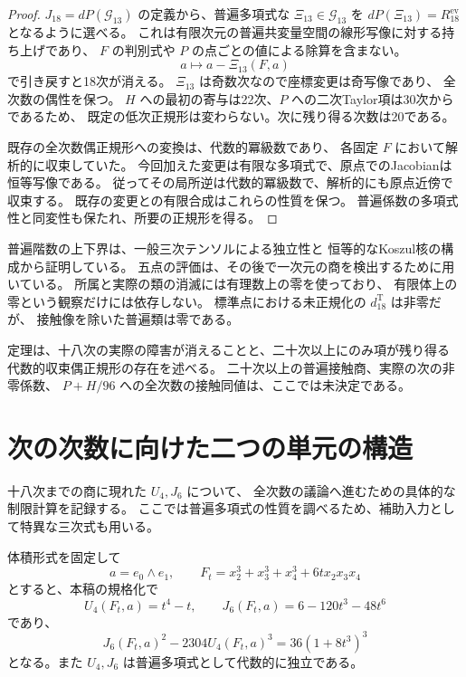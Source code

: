 \begin{proof}
$J_{18}=dP(\mathcal G_{13})$ の定義から、普遍多項式な
$\Xi_{13}\in\mathcal G_{13}$ を
$dP(\Xi_{13})=R_{18}^{\mathrm{ev}}$ となるように選べる。
これは有限次元の普遍共変量空間の線形写像に対する持ち上げであり、
$F$ の判別式や $P$ の点ごとの値による除算を含まない。
\[
 a\longmapsto a-\Xi_{13}(F,a)
\]
で引き戻すと18次が消える。
$\Xi_{13}$ は奇数次なので座標変更は奇写像であり、
全次数の偶性を保つ。
$H$ への最初の寄与は22次、$P$ への二次Taylor項は30次からであるため、
既定の低次正規形は変わらない。次に残り得る次数は20である。

既存の全次数偶正規形への変換は、代数的冪級数であり、
各固定 $F$ において解析的に収束していた。
今回加えた変更は有限な多項式で、原点でのJacobianは恒等写像である。
従ってその局所逆は代数的冪級数で、解析的にも原点近傍で収束する。
既存の変更との有限合成はこれらの性質を保つ。
普遍係数の多項式性と同変性も保たれ、所要の正規形を得る。
\end{proof}

\begin{remark}[有限計算の範囲と残る問題]
普遍階数の上下界は、一般三次テンソルによる独立性と
恒等的なKoszul核の構成から証明している。
五点の評価は、その後で一次元の商を検出するために用いている。
所属と実際の類の消滅には有理数上の零を使っており、
有限体上の零という観察だけには依存しない。
標準点における未正規化の $d^{\mathrm T}_{18}$ は非零だが、
接触像を除いた普遍類は零である。

定理は、十八次の実際の障害が消えることと、二十次以上にのみ項が残り得る
代数的収束偶正規形の存在を述べる。
二十次以上の普遍接触商、実際の次の非零係数、
$P+H/96$ への全次数の接触同値は、ここでは未決定である。
\end{remark}



\section{次の次数に向けた二つの単元の構造}
\label{sec:v14-unit-structure}

十八次までの商に現れた $U_4,J_6$ について、
全次数の議論へ進むための具体的な制限計算を記録する。
ここでは普遍多項式の性質を調べるため、補助入力として特異な三次式も用いる。

\begin{proposition}[階数二の点における単元の制限と代数的独立性]
\label{prop:v14-rank-two-unit-restriction}
体積形式を固定して
\[
 a=e_0\wedge e_1,\qquad
 F_t=x_2^3+x_3^3+x_4^3+6t x_2x_3x_4
\]
とすると、本稿の規格化で
\[
 U_4(F_t,a)=t^4-t,\qquad
 J_6(F_t,a)=6-120t^3-48t^6
\]
であり、
\[
 J_6(F_t,a)^2-2304U_4(F_t,a)^3=36(1+8t^3)^3
\]
となる。また $U_4,J_6$ は普遍多項式として代数的に独立である。
\end{proposition}

